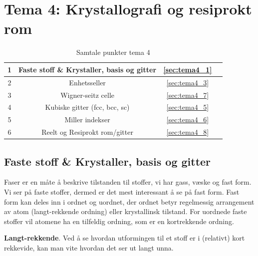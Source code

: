 \section{Tema 4: Krystallografi og resiprokt rom}
\label{tema4}

\begin{table}[!htb]
    \centering
    \caption{Samtale punkter tema 4}
    \begin{tabular}{|c|c|c|r|}
      \hline
      1 & Faste stoff \& Krystaller, basis og gitter &  \autoref{sec:tema4_1} & \cellcolor{green}\quad\quad \\
      \hline 
      2 & Enhetsseller & \autoref{sec:tema4_3} & \cellcolor{green} \\
      \hline
      3 & Wigner-seitz celle & \autoref{sec:tema4_7} & \cellcolor{green} \\
      \hline 
      4 & Kubiske gitter (fcc, bcc, sc) & \autoref{sec:tema4_5} & \cellcolor{green} \\
      \hline
      5 & Miller indekser & \autoref{sec:tema4_6} & \cellcolor{green} \\ 
      \hline
      6 & Reelt og Resiprokt rom/gitter & \autoref{sec:tema4_8} & \cellcolor{blue} \\
      \hline
    \end{tabular}
    \label{tab:samtalePunkt_tema1}
\end{table}

\subsection{Faste stoff \& Krystaller, basis og gitter}
\label{sec:tema4_1}
Faser er en måte å beskrive tilstanden til stoffer, vi har gass, væske og fast form. Vi ser på faste stoffer, dermed er det mest interessant å se på fast form. Fast form kan deles inn i ordnet og uordnet, der ordnet betyr regelmessig arrangement av atom (langt-rekkende ordning) eller krystallinsk tilstand. For uordnede faste stoffer vil atomene ha en tilfeldig ordning, som er en kortrekkende ordning. 

\begin{definition}
    \textbf{Langt-rekkende}. Ved å se hvordan utformingen til et stoff er i (relativt) kort rekkevide, kan man vite hvordan det ser ut langt unna.
\end{definition}

